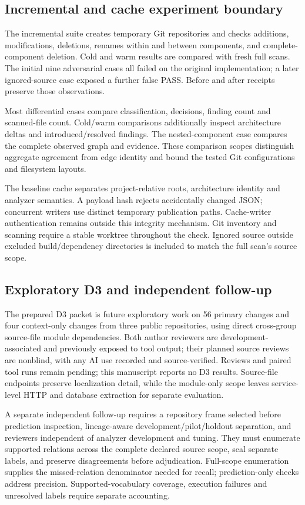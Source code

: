 \subsection{Incremental and cache experiment boundary}
The incremental suite creates temporary Git repositories and checks additions, modifications, deletions, renames within and between components, and complete-component deletion. Cold and warm results are compared with fresh full scans. The initial nine adversarial cases all failed on the original implementation; a later ignored-source case exposed a further false PASS. Before and after receipts preserve those observations.

Most differential cases compare classification, decisions, finding count and scanned-file count. Cold/warm comparisons additionally inspect architecture deltas and introduced/resolved findings. The nested-component case compares the complete observed graph and evidence. These comparison scopes distinguish aggregate agreement from edge identity and bound the tested Git configurations and filesystem layouts.

The baseline cache separates project-relative roots, architecture identity and analyzer semantics. A payload hash rejects accidentally changed JSON; concurrent writers use distinct temporary publication paths. Cache-writer authentication remains outside this integrity mechanism. Git inventory and scanning require a stable worktree throughout the check. Ignored source outside excluded build/dependency directories is included to match the full scan's source scope.

\subsection{Exploratory D3 and independent follow-up}
The prepared D3 packet is future exploratory work on 56 primary changes and four context-only changes from three public repositories, using direct cross-group source-file module dependencies. Both author reviewers are development-associated and previously exposed to tool output; their planned source reviews are nonblind, with any AI use recorded and source-verified. Reviews and paired tool runs remain pending; this manuscript reports no D3 results. Source-file endpoints preserve localization detail, while the module-only scope leaves service-level HTTP and database extraction for separate evaluation.

A separate independent follow-up requires a repository frame selected before prediction inspection, lineage-aware development/pilot/holdout separation, and reviewers independent of analyzer development and tuning. They must enumerate supported relations across the complete declared source scope, seal separate labels, and preserve disagreements before adjudication. Full-scope enumeration supplies the missed-relation denominator needed for recall; prediction-only checks address precision. Supported-vocabulary coverage, execution failures and unresolved labels require separate accounting.

